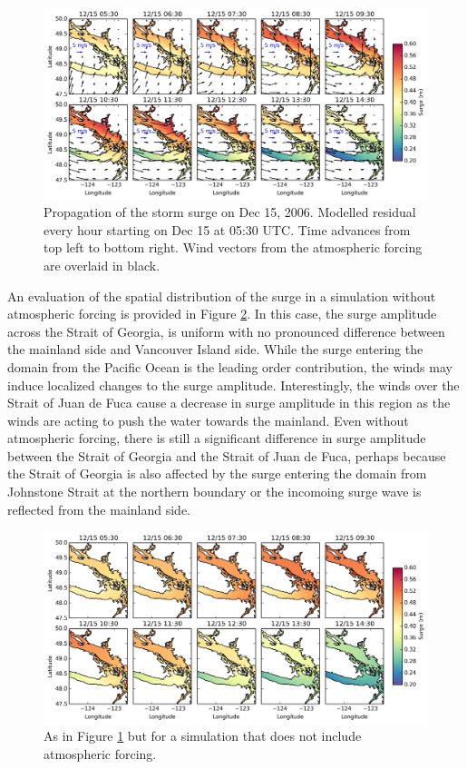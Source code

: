 \documentclass[pdftex,10pt]{article}
\begin{document}
\begin{figure}
\centering
\includegraphics[scale=0.6]{Figures/dec2006_spatial.pdf}
\caption{Propagation of the storm surge on Dec 15, 2006. Modelled residual every hour starting on Dec 15 at 05:30 UTC. Time advances from top left to bottom right. Wind vectors from the atmospheric forcing are overlaid in black.}
\label{fig:spatial}
\end{figure}

An evaluation of the spatial distribution of the surge in a simulation without atmospheric forcing is provided in Figure \ref{fig:spatial_sshonly}. In this case, the surge amplitude across the Strait of Georgia, is uniform with no pronounced difference between the mainland side and Vancouver Island side. While the surge entering the domain from the Pacific Ocean is the leading order contribution, the winds may induce localized changes to the surge amplitude. Interestingly, the winds over the Strait of Juan de Fuca cause a decrease in surge amplitude in this region as the winds are acting to push the water towards the mainland.  Even without atmospheric forcing, there is still a significant difference in surge amplitude between the Strait of Georgia and the Strait of Juan de Fuca, perhaps because the Strait of Georgia is also affected by the surge entering the domain from Johnstone Strait at the northern boundary or the incomoing surge wave is reflected from the mainland side. %

\begin{figure}
\centering
\includegraphics[scale=0.6]{Figures/dec2006_spatial_sshonly.pdf}
\caption{As in Figure \ref{fig:spatial} but for a simulation that does not include atmospheric forcing. }
\label{fig:spatial_sshonly}
\end{figure}
\end{document}
